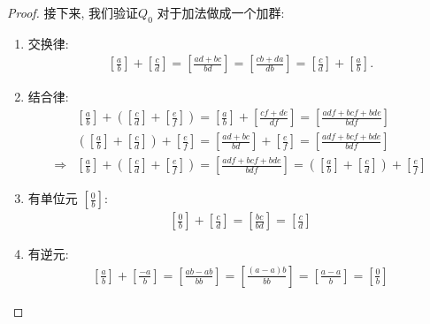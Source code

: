 \documentclass[utf8]{ctexbook}
\theoremstyle{definition}
\begin{document}
\begin{proof}
接下来, 我们验证$Q_0$ 对于加法做成一个加群:
\begin{enumerate}
\item{交换律:
\begin{align*}
\left[ \frac{a}{b} \right]  + \left[ \frac{c}{d} \right] = \left[ \frac{a d  + b c }{b d} \right] = \left[ \frac{c b  + d a }{d b} \right] = \left[ \frac{c}{d} \right] + \left[ \frac{a}{b} \right]   .
\end{align*}
}
\item{结合律:
\begin{align*}
& \left[ \frac{a}{b} \right] + \left(\left[ \frac{c}{d} \right] + \left[ \frac{e}{f} \right]  \right) = \left[ \frac{a}{b} \right] + \left[ \frac{cf + de  }{df} \right]  =  \left[ \frac{adf + bcf + bde  }{bdf} \right] \\
& \left( \left[ \frac{a}{b} \right] + \left[ \frac{c}{d} \right] \right) + \left[ \frac{e}{f} \right] =  \left[ \frac{a d  + b c }{b d} \right] + \left[ \frac{e}{f} \right] = \left[ \frac{a d f + b c f+ bde}{b d f} \right] \\
\Longrightarrow & \left[ \frac{a}{b} \right] + \left(\left[ \frac{c}{d} \right] + \left[ \frac{e}{f} \right]  \right) = \left[ \frac{adf + bcf + bde  }{bdf} \right] = \left( \left[ \frac{a}{b} \right] + \left[ \frac{c}{d} \right] \right) + \left[ \frac{e}{f} \right] 
\end{align*}
}
\item{有单位元 $ \left[ \frac{0}{b} \right] $:
\begin{align*}
\left[ \frac{0}{b} \right] + \left[ \frac{c}{d} \right] = \left[ \frac{b c}{b d} \right] = \left[ \frac{c}{d} \right] 
\end{align*}

}
\item{有逆元:
\begin{align*}
\left[ \frac{a}{b} \right] + \left[ \frac{-a}{b} \right] = \left[ \frac{a b - a b}{b b} \right] = \left[ \frac{(a  - a) b}{b b} \right] = \left[ \frac{a  - a }{ b} \right] = \left[ \frac{0}{b} \right] 
\end{align*}
}
\end{enumerate}


\end{proof}
\end{document}
